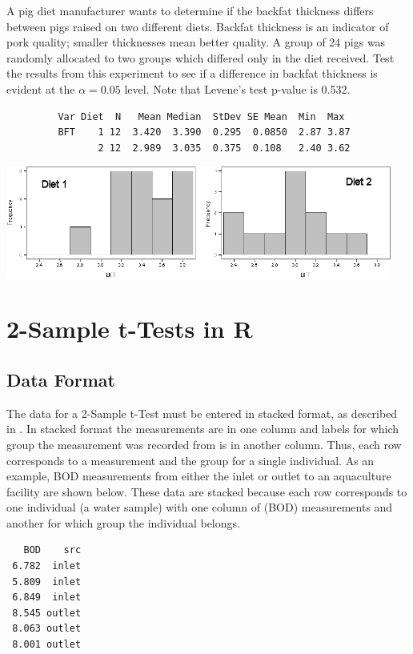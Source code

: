 \documentclass[10pt,openany]{book}\usepackage[]{graphicx}\usepackage[]{color}
\makeatletter
\newenvironment{kframe}{%
 \def\at@end@of@kframe{}%
 \ifinner\ifhmode%
  \def\at@end@of@kframe{\end{minipage}}%
  \begin{minipage}{\columnwidth}%
 \fi\fi%
 \def\FrameCommand##1{\hskip\@totalleftmargin \hskip-\fboxsep
 \colorbox{shadecolor}{##1}\hskip-\fboxsep
     \hskip-\linewidth \hskip-\@totalleftmargin \hskip\columnwidth}%
 \MakeFramed {\advance\hsize-\width
   \@totalleftmargin\z@ \linewidth\hsize
   \@setminipage}}%
 {\par\unskip\endMakeFramed%
 \at@end@of@kframe}
\newenvironment{knitrout}{}{} %
\makeatother
\begin{document}
\begin{exsection}
  \item \label{revex:tTestPigBFT} A pig diet manufacturer wants to determine if the backfat thickness differs between pigs raised on two different diets.  Backfat thickness is an indicator of pork quality; smaller thicknesses mean better quality.  A group of 24 pigs was randomly allocated to two groups which differed only in the diet received.  Test the results from this experiment to see if a difference in backfat thickness is evident at the $\alpha=0.05$ level.  Note that Levene's test p-value is 0.532. 
  \begin{Verbatim}
         Var Diet  N   Mean Median  StDev SE Mean  Min  Max
         BFT    1 12  3.420  3.390  0.295  0.0850  2.87 3.87
                2 12  2.989  3.035  0.375  0.108   2.40 3.62
  \end{Verbatim}
  \begin{center}
    \includegraphics[width=5in]{Figs/t2pigbft.png}
  \end{center}

\end{exsection}

\section{2-Sample t-Tests in R}\label{sect:2tData}
\vspace{-12pt}
\subsection{Data Format}
\vspace{-12pt}
The data for a 2-Sample t-Test must be entered in stacked format, as described in . In stacked format the measurements are in one column and labels for which group the measurement was recorded from is in another column. Thus, each row corresponds to a measurement and the group for a single individual. As an example, BOD measurements from either the inlet or outlet to an aquaculture facility are shown below. These data are stacked because each row corresponds to one individual (a water sample) with one column of (BOD) measurements and another for which group the individual belongs.
\begin{knitrout}
\color{fgcolor}\begin{kframe}
\begin{verbatim}
   BOD    src
 6.782  inlet
 5.809  inlet
 6.849  inlet
 8.545 outlet
 8.063 outlet
 8.001 outlet
\end{verbatim}
\end{kframe}
\end{knitrout}
\end{document}
